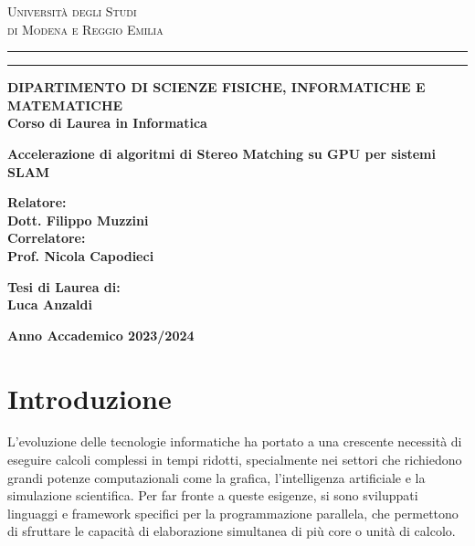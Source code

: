 \documentclass[12pt,a4paper]{report}
\begin{document}
\begin{titlepage}
\begin{center}
{{\Large{\textsc{Università degli Studi \\ \vspace{2mm} di Modena e Reggio Emilia}}}} \rule[0.1cm]{14cm}{0.1mm}
\rule[0.5cm]{14cm}{0.6mm}
{\small{\bf DIPARTIMENTO DI SCIENZE FISICHE, INFORMATICHE E MATEMATICHE\\
Corso di Laurea in Informatica}}

\end{center}
\vspace{20mm}
\begin{center}
{\LARGE{\bf Accelerazione di algoritmi di Stereo Matching su GPU per sistemi SLAM  }}\\
\vspace{3mm}
\end{center}
\vspace{40mm}
\par
\noindent
\begin{minipage}[t]{0.47\textwidth}
{\large{\bf Relatore:\\Dott. Filippo Muzzini}} \\
{\large{\bf Correlatore:\\Prof. Nicola Capodieci}}
\end{minipage}
\hfill
\begin{minipage}[t]{0.47\textwidth}\raggedleft
{\large{\bf Tesi di Laurea di:\\
Luca Anzaldi}}
\end{minipage}
\vspace{20mm}
\begin{center}
{\large{\bf Anno Accademico 2023/2024}}
\end{center}
\end{titlepage}

\tableofcontents

\chapter{Introduzione}

L’evoluzione delle tecnologie informatiche ha portato a una crescente necessità di eseguire calcoli complessi in tempi ridotti, specialmente nei settori che richiedono grandi potenze computazionali come la grafica, l'intelligenza artificiale e la simulazione scientifica. Per far fronte a queste esigenze, si sono sviluppati linguaggi e framework specifici per la programmazione parallela, che permettono di sfruttare le capacità di elaborazione simultanea di più core o unità di calcolo.
\end{document}
